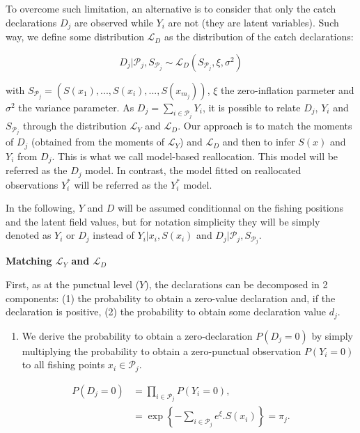 \documentclass[
  english,
  man,floatsintext]{apa6}
\providecommand{\tightlist}{%
  \setlength{\itemsep}{0pt}\setlength{\parskip}{0pt}}
\begin{document}
To overcome such limitation, an alternative is to consider that only the catch declarations \(D_j\) are observed while \(Y_i\) are not (they are latent variables). Such way, we define some distribution \(\mathcal{L}_D\) as the distribution of the catch declarations:

\[D_j | \mathcal{P}_j,S_{\mathcal{P}_j} \sim \mathcal{L}_D( S_{\mathcal{P}_j},\xi,\sigma^2)\]

with \(S_{\mathcal{P}_j}=(S(x_1),...,S(x_i), ...,S(x_{m_j}))\), \(\xi\) the zero-inflation parmeter and \(\sigma^2\) the variance parameter. As \(D_j=\sum_{i \in \mathcal{P}_j}{Y_{i}}\), it is possible to relate \(D_j\), \(Y_i\) and \(S_{\mathcal{P}_j}\) through the distribution \(\mathcal{L}_Y\) and \(\mathcal{L}_D\). Our approach is to match the moments of \(D_j\) (obtained from the moments of \(\mathcal{L}_Y\)) and \(\mathcal{L}_D\) and then to infer \(S(x)\) and \(Y_i\) from \(D_j\). This is what we call model-based reallocation. This model will be referred as the \(D_j\) model. In contrast, the model fitted on reallocated observations \(Y^*_i\) will be referred as the \(Y^*_i\) model.

In the following, \(Y\) and \(D\) will be assumed conditionnal on the fishing positions and the latent field values, but for notation simplicity they will be simply denoted as \(Y_i\) or \(D_j\) instead of \(Y_i \vert x_i, S(x_i)\) and \(D_j | \mathcal{P}_j,S_{\mathcal{P}_j}\).

\textbf{Matching \(\mathcal{L}_Y\) and \(\mathcal{L}_D\)}

First, as at the punctual level (\(Y\)), the declarations can be decomposed in 2 components: (1) the probability to obtain a zero-value declaration and, if the declaration is positive, (2) the probability to obtain some declaration value \(d_j\).

\begin{enumerate}
\def\labelenumi{(\arabic{enumi})}
\tightlist
\item
  We derive the probability to obtain a zero-declaration \(P(D_j = 0)\) by simply multiplying the probability to obtain a zero-punctual observation \(P(Y_i=0 )\) to all fishing points \(x_i \in \mathcal{P}_j\).
\end{enumerate}

\begin{align*}
P(D_j = 0) & = \prod_{i\in \mathcal{P}_j} P(Y_{i} = 0),\nonumber \\
                      & = \exp{ \left \lbrace- \sum_{i\in \mathcal{P}_j} e^{\xi}. S(x_{i})\right \rbrace} = \pi_j.
\end{align*}
\end{document}
